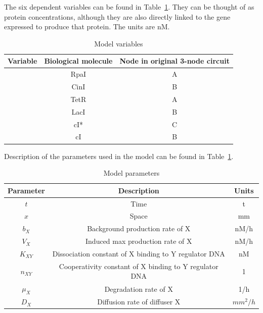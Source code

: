 The six dependent variables can be found in Table~\ref{tab:Model variables}.
They can be thought of as protein concentrations, although they are also directly linked to the gene expressed to produce that protein.
The units are nM.
\begin{table}[H]
    \centering
    \caption{Model variables}
    \label{tab:Model variables}
    \renewcommand{\arraystretch}{1.3} %
    \begin{tabular}{|c|c|c|}
        \hline
        \textbf{Variable} & \textbf{Biological molecule} & \textbf{Node in original 3-node circuit}\\
        \hline
        [A] & RpaI & A\\
        \hline
        [B] & CinI & B \\
        \hline
        [C] & TetR & A\\
        \hline
        [D] & LacI & B \\
        \hline
        [E] & cI* & C \\
        \hline
        [F] & cI & B \\
        \hline
    \end{tabular}
\end{table}
Description of the parameters used in the model can be found in Table~\ref{tab:Model variables}.

\begin{table}[H]
    \centering
    \caption{Model parameters}
    \label{tab:variables}
    \renewcommand{\arraystretch}{1.3} %
    \begin{tabular}{|c|c|c|}
        \hline
        \textbf{Parameter} & \textbf{Description} & Units\\
        \hline
        $t$ & Time & t\\
        \hline
        $x$ & Space & mm\\
        \hline
        $b_{X}$ & Background production rate of X & nM/h\\
        \hline
        $V_{X}$ & Induced max production rate of X & nM/h \\
        \hline
        $K_{XY}$ & Dissociation constant of X binding to Y regulator DNA & nM \\
        \hline
        $n_{XY}$ & Cooperativity constant of X binding to Y regulator DNA & 1\\
        \hline
        $\mu_{X}$ & Degradation rate of X & 1/h\\
        \hline
        $D_{X}$ & Diffusion rate of diffuser X & $mm^2/h$\\
        \hline

    \end{tabular}
\end{table}


